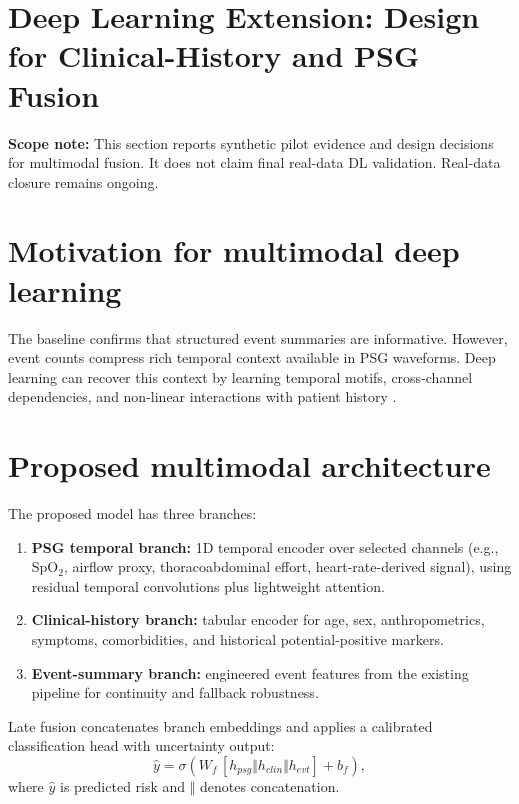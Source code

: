 \documentclass[10pt,a4paper,twocolumn]{article}
\newcommand{\chapter}[1]{\section{#1}}
\begin{document}
\chapter{Deep Learning Extension: Design for Clinical-History and PSG Fusion}
\noindent\textbf{Scope note:} This section reports synthetic pilot evidence and design decisions for multimodal fusion. It does not claim final real-data DL validation. Real-data closure remains ongoing.

\section{Motivation for multimodal deep learning}
The baseline confirms that structured event summaries are informative. However, event counts compress rich temporal context available in PSG waveforms. Deep learning can recover this context by learning temporal motifs, cross-channel dependencies, and non-linear interactions with patient history \citep{biswal2018sleeptransformer,baltrusaitis2019multimodal}.

\section{Proposed multimodal architecture}
The proposed model has three branches:
\begin{enumerate}[leftmargin=1.2cm]
    \item \textbf{PSG temporal branch:} 1D temporal encoder over selected channels (e.g., SpO$_2$, airflow proxy, thoracoabdominal effort, heart-rate-derived signal), using residual temporal convolutions plus lightweight attention.
    \item \textbf{Clinical-history branch:} tabular encoder for age, sex, anthropometrics, symptoms, comorbidities, and historical potential-positive markers.
    \item \textbf{Event-summary branch:} engineered event features from the existing pipeline for continuity and fallback robustness.
\end{enumerate}

Late fusion concatenates branch embeddings and applies a calibrated classification head with uncertainty output:
\begin{equation}
\hat{y} = \sigma\left(W_f\,[h_{psg} \Vert h_{clin} \Vert h_{evt}] + b_f\right),
\end{equation}
where $\hat{y}$ is predicted risk and $\Vert$ denotes concatenation.
\end{document}

